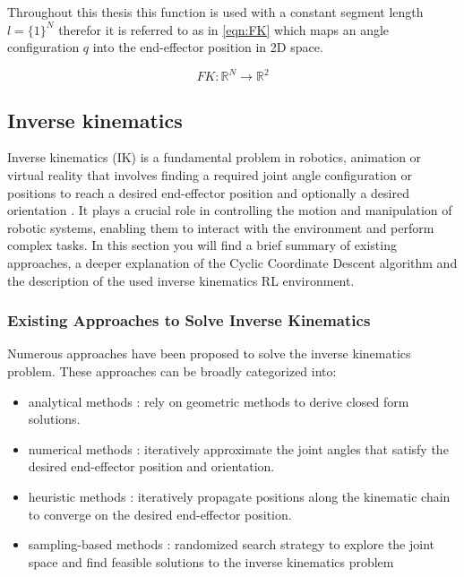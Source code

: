 Throughout this thesis this function is used with a constant segment length $l = \{1\}^N$ therefor it is referred to as in \eqref{eqn:FK} which maps an angle configuration $q$ into the end-effector position in 2D space.

\begin{equation}\label{eqn:FK}
	FK: \mathbb{R}^N \to \mathbb{R}^2
\end{equation}

\subsection{Inverse kinematics}

Inverse kinematics (IK) is a fundamental problem in robotics, animation or virtual reality that involves finding a required joint angle configuration or positions to reach a desired end-effector position and optionally a desired orientation \cite{InverseKinemaitcs}. It plays a crucial role in controlling the motion and manipulation of robotic systems, enabling them to interact with the environment and perform complex tasks. 
In this section you will find a brief summary of existing approaches, a deeper explanation of the Cyclic Coordinate Descent algorithm and the description of the used inverse kinematics RL environment.

\subsubsection{Existing Approaches to Solve Inverse Kinematics}

Numerous approaches have been proposed to solve the inverse kinematics problem. These approaches can be broadly categorized into: 
\begin{itemize}
	\item analytical methods \cite{IK_ClosedForm}: rely on geometric methods to derive closed form solutions.
	\item numerical methods \cite{NumericalMethods}: iteratively approximate the joint angles that satisfy the desired end-effector position and orientation.
	\item heuristic methods \cite{NumericalMethods}: iteratively propagate positions along the kinematic chain to converge on the desired end-effector position.
	\item sampling-based methods \cite{NumericalMethods}: randomized search strategy to explore the joint space and find feasible solutions to the inverse kinematics problem
\end{itemize}

